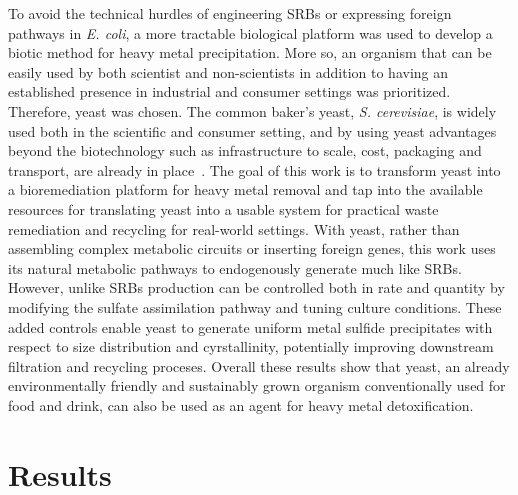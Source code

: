 \documentclass[../main/main]{subfiles}
\begin{document}
To avoid the technical hurdles of engineering SRBs or expressing foreign pathways in \textit{E. coli}, a more tractable biological platform was used to develop a biotic method for heavy metal precipitation. More so, an organism that can be easily used by both scientist and non-scientists in addition to having an established presence in industrial and consumer settings was prioritized. Therefore, yeast was chosen. The common baker's yeast, \textit{S. cerevisiae}, is widely used both in the scientific and consumer setting, and by using yeast advantages beyond the biotechnology such as infrastructure to scale, cost, packaging and transport, are already in place~\cite{vieira2013,barth-haasgroup.n.d.,prnewswire.n.d.}. The goal of this work is to transform yeast into a bioremediation platform for heavy metal removal and tap into the available resources for translating yeast into a usable system for practical waste remediation and recycling for real-world settings. With yeast, rather than assembling complex metabolic circuits or inserting foreign genes, this work uses its natural metabolic pathways to endogenously generate \HS{} much like SRBs. However, unlike SRBs \HS{} production can be controlled both in rate and quantity by modifying the sulfate assimilation pathway and tuning culture conditions. These added controls enable yeast to generate uniform metal sulfide precipitates with respect to size distribution and cyrstallinity, potentially improving downstream filtration and recycling proceses. Overall these results show that yeast, an already environmentally friendly and sustainably grown organism conventionally used for food and drink, can also be used as an agent for heavy metal detoxification.

\section{Results}

\end{document}
